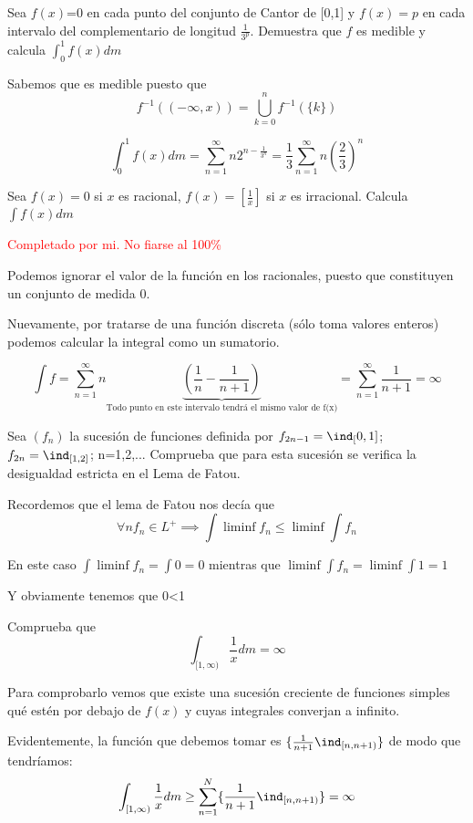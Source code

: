 \begin{problem}[2]
Sea $f(x)$=0 en cada punto del conjunto de Cantor de [0,1] y $f(x)=p$ en cada intervalo del complementario de longitud $\frac{1}{3^p}$. Demuestra que $f$ es medible y calcula $\int_0^1f(x)dm$

\solution

Sabemos que es medible puesto que
\[f^{-1}((-\infty, x)) = \bigcup_{k=0}^nf^{-1}(\{k\})\]

\[\int_0^1 f(x)dm= \sum_{n=1}^{\infty}n2^{n-\frac{1}{3^n}} = \frac{1}{3}\sum_{n=1}^{\infty} n \left(\frac{2}{3}\right)^n\]
\end{problem}

\begin{problem}[3]
Sea $f(x) = 0$ si $x$ es racional, $f(x)=[\frac{1}{x}]$ si $x$ es irracional. Calcula $\int f(x)dm$

\solution
\textcolor{red}{Completado por mi. No fiarse al 100\%}

Podemos ignorar el valor de la función en los racionales, puesto que constituyen un conjunto de medida 0.

Nuevamente, por tratarse de una función discreta (sólo toma valores enteros) podemos calcular la integral como un sumatorio.

\[\int f = \sum_{n=1}^{\infty} n \underbrace{\left( \frac{1}{n}-\frac{1}{n+1}\right)}_{\text{Todo punto en este intervalo tendrá el mismo valor de f(x)}} = \sum_{n=1}^{\infty} \frac{1}{n+1} = \infty\]

\end{problem}

\begin{problem}[4]
Sea $(f_n)$ la sucesión de funciones definida por $f_{2n-1}=\ind_[0,1]$; $f_{2n}=\ind_{[1,2]}$; n=1,2,... Comprueba que para esta sucesión se verifica la desigualdad estricta en el Lema de Fatou.

\solution

Recordemos que el lema de Fatou nos decía que
\[\forall n f_n \in L^+ \implies \int \liminf f_n \leq \liminf \int f_n\]

En este caso $\int \liminf f_n = \int 0 = 0$ mientras que $\liminf \int f_n = \liminf \int 1 = 1$

Y obviamente tenemos que 0<1
\end{problem}

\begin{problem}[5]

Comprueba que
\[\int_{[1,\infty)} \frac{1}{x}dm = \infty\]

\solution

Para comprobarlo vemos que existe una sucesión creciente de funciones simples qué estén por debajo de $f(x)$ y cuyas integrales converjan a infinito.

Evidentemente, la función que debemos tomar es $\{\frac{1}{n+1}\ind_{[n,n+1)}\}$ de modo que tendríamos:
\[\int_{[1,\infty)} \frac{1}{x}dm \geq \sum_{n=1}^N \{\frac{1}{n+1}\ind_{[n,n+1)}\} = \infty\]

\end{problem}


